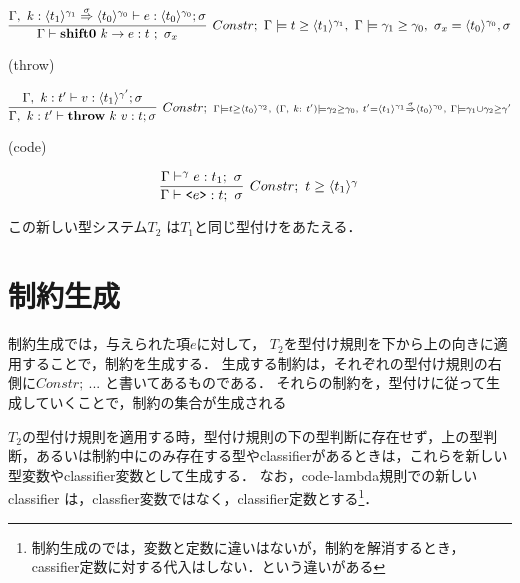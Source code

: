 \[
  \infer[Constr;~\Gamma \models \longer{t}{\codeT{t_1}{\gamma_1}},~ \Gamma \models \longer{\gamma_1}{\gamma_0},~ \sigma_x = \codeT{t_0}{\gamma_0}, \sigma]
  {\Gamma \vdash \shiftz{k}{e} : t~;~ \sigma_x}
  {\Gamma,~k:\contT{\codeT{t_1}{\gamma_1}}{\codeT{t_0}{\gamma_0}}{\sigma}
    \vdash e : \codeT{t_0}{\gamma_0} ; \sigma
  }
\]

(throw)

\[
  \infer[Constr;~ {\scriptstyle \Gamma \models \longer{t}{\codeT{t_0}{\gamma_2}},~ (\Gamma,~ k:~t') \models \gamma_2 \ord \gamma_0,~  t' = \contT{\codeT{t_1}{\gamma_1}}{\codeT{t_0}{\gamma_0}}{\sigma},~ \Gamma \models \gamma_1 \uni \gamma_2 \ord \gamma'}]
  {\Gamma,~ k:t'
    \vdash \throw{k}{v} : t ; \sigma}
  {\Gamma,~ k:t'
    \vdash v : \codeT{t_1}{\gamma'} ; \sigma
  }
\]

(code)

\[
  \infer[Constr;~\longer{t}{\codeT{t_1}{\gamma}}]
  {\Gamma \vdash \code{e} : t;~\sigma}
  {\Gamma \vdash^\gamma e : t_1;~\sigma}
\]


この新しい型システム$T_2$ は$T_1$と同じ型付けをあたえる．

\section{制約生成}

制約生成では，与えられた項$e$に対して，
$T_2$を型付け規則を下から上の向きに適用することで，制約を生成する．
生成する制約は，それぞれの型付け規則の右側に$Constr;~ ...$ と書いてあるものである．
それらの制約を，型付けに従って生成していくことで，制約の集合が生成される

$T_2$の型付け規則を適用する時，型付け規則の下の型判断に存在せず，上の型判断，あるいは制約中にのみ存在する型やclassifierがあるときは，これらを新しい型変数やclassifier変数として生成する．
なお，code-lambda規則での新しいclassifier は，classfier変数ではなく，classifier定数とする\footnote{制約生成のでは，変数と定数に違いはないが，制約を解消するとき，cassifier定数に対する代入はしない．という違いがある}．

